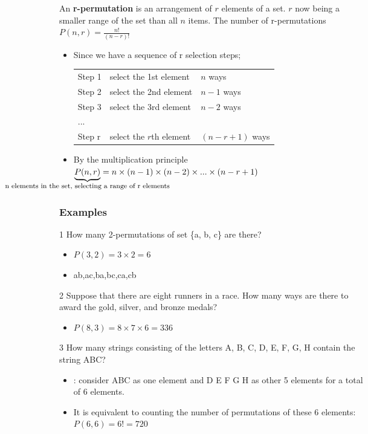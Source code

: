 \documentclass[12pt, letterpaper]{article}
\newcommand{\cul}[1]{%
		\uline{\phantom{#1}}%
		\llap{\contour{white}{#1}}%
	}
\newcommand{\exheader}[1][ex]{{\tiny{#1}\normalsize}}
\begin{document}
\bigbreak
\bigbreak

An \textbf{r-permutation} is an \cul{ordered} arrangement of $r$ elements of a set. $r$ now being a smaller range of the set than all $n$ items.
\smallbreak
The number of r-permutations $P(n,r) = \frac{n!}{(n-r)!}$ 
\begin{itemize}[leftmargin=*, label={}]
	\item Since we have a sequence of r selection steps; \\
	\begin{tabular}{l l l}
		Step 1& select the 1st element & $n$ ways \\
		Step 2& select the 2nd element & $n-1$ ways \\
		Step 3& select the 3rd element & $n-2$ ways \\
		...& & \\
		Step r & select the $r$th element & $(n-r +1)$ ways \\
	\end{tabular}
	\item By the multiplication principle $\underbrace{P(n,r)}_{\makebox[0pt]{\footnotesize n elements in the set, selecting a range of r elements}} = n \times (n-1) \times (n -2) \times ... \times (n-r+1)$
\end{itemize}

\pagebreak

\subsubsection*{Examples}

\exheader[1] How many 2-permutations of set \{a, b, c\} are there?
\begin{itemize}[leftmargin=*, label={}]
	\item $P(3,2) = 3 \times 2 = 6$
	\item ab,ac,ba,bc,ca,cb
\end{itemize}

\bigbreak

\exheader[2] Suppose that there are eight runners in a race. How many ways are there to award the gold, silver, and bronze medals?
\begin{itemize}[leftmargin=*, label={}]
	\item $P(8,3) = 8 \times 7 \times 6 = 336$
\end{itemize}

\bigbreak

\exheader[3] How many strings consisting of the letters A, B, C, D, E, F, G, H contain the string ABC?
\begin{itemize}[leftmargin=*, label={}]
	\item \cul{Idea}: consider ABC as one element and D E F G H as other 5 elements for a total of 6 elements.
	\item It is equivalent to counting the number of permutations of these 6 elements: $P(6,6) = 6! = 720$
\end{itemize}
\end{document}
